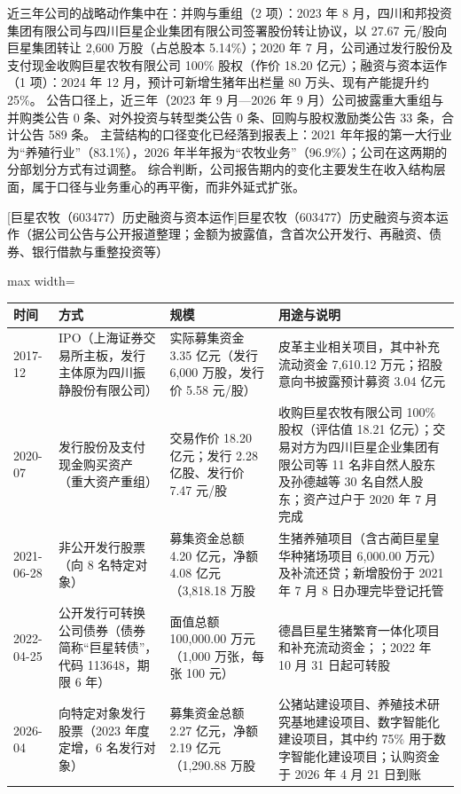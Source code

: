  近三年公司的战略动作集中在：并购与重组（2 项）：2023 年 8 月，四川和邦投资集团有限公司与四川巨星企业集团有限公司签署股份转让协议，以 27.67 元/股向巨星集团转让 2,600 万股（占总股本 5.14\%）；2020 年 7 月，公司通过发行股份及支付现金收购巨星农牧有限公司 100\% 股权（作价 18.20 亿元）；融资与资本运作（1 项）：2024 年 12 月，预计可新增生猪年出栏量 80 万头、现有产能提升约 25\%。 公告口径上，近三年（2023 年 9 月---2026 年 9 月）公司披露重大重组与并购类公告 0 条、对外投资与转型类公告 0 条、回购与股权激励类公告 33 条，合计公告 589 条。 主营结构的口径变化已经落到报表上：2021 年年报的第一大行业为“养殖行业”（83.1\%），2026 年半年报为“农牧业务”（96.9\%）；公司在这两期的分部划分方式有过调整。 综合判断，公司报告期内的变化主要发生在收入结构层面，属于口径与业务重心的再平衡，而非外延式扩张。

\begin{center}\small\setlength{\tabcolsep}{4pt}
[巨星农牧（603477）历史融资与资本运作]{巨星农牧（603477）历史融资与资本运作（据公司公告与公开报道整理；金额为披露值，含首次公开发行、再融资、债券、银行借款与重整投资等）}
\begin{adjustbox}{max width=\textwidth}
\begin{tabular}{@{}p{1.45cm}p{2.55cm}p{4.05cm}p{4.95cm}@{}}
\toprule
时间 & 方式 & 规模 & 用途与说明 \\
\midrule
2017-12 & IPO（上海证券交易所主板，发行主体原为四川振静股份有限公司） & 实际募集资金 3.35 亿元（发行 6,\allowbreak{}000 万股，\allowbreak{}发行价 5.58 元/\allowbreak{}股） & 皮革主业相关项目，\allowbreak{}其中补充流动资金 7,\allowbreak{}610.12 万元；招股意向书披露预计募资 3.04 亿元 \\
2020-07 & 发行股份及支付现金购买资产（重大资产重组） & 交易作价 18.20 亿元；发行 2.28 亿股、\allowbreak{}发行价 7.47 元/\allowbreak{}股 & 收购巨星农牧有限公司 100\% 股权（评估值 18.21 亿元）；交易对方为四川巨星企业集团有限公司等 11 名非自然人股东及孙德越等 30 名自然人股东；资产过户于 2020 年 7 月完成 \\
2021-06-28 & 非公开发行股票（向 8 名特定对象） & 募集资金总额 4.20 亿元，\allowbreak{}净额 4.08 亿元（3,\allowbreak{}818.18 万股 & 生猪养殖项目（含古蔺巨星皇华种猪场项目 6,\allowbreak{}000.00 万元）及补流还贷；新增股份于 2021 年 7 月 8 日办理完毕登记托管 \\
2022-04-25 & 公开发行可转换公司债券（债券简称“巨星转债”，代码 113648，期限 6 年） & 面值总额 100,\allowbreak{}000.00 万元（1,\allowbreak{}000 万张，\allowbreak{}每张 100 元） & 德昌巨星生猪繁育一体化项目和补充流动资金；；2022 年 10 月 31 日起可转股 \\
2026-04 & 向特定对象发行股票（2023 年度定增，6 名发行对象） & 募集资金总额 2.27 亿元，\allowbreak{}净额 2.19 亿元（1,\allowbreak{}290.88 万股 & 公猪站建设项目、\allowbreak{}养殖技术研究基地建设项目、\allowbreak{}数字智能化建设项目，\allowbreak{}其中约 75\% 用于数字智能化建设项目；认购资金于 2026 年 4 月 21 日到账 \\
\bottomrule
\end{tabular}
\end{adjustbox}
\end{center}

